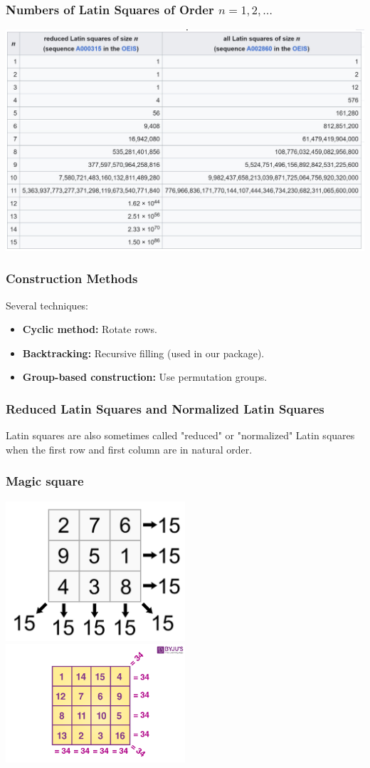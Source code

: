 \documentclass{beamer}
\begin{document}
\begin{frame}
\frametitle{Numbers of Latin Squares of Order $n=1, 2, \dots$}
\includegraphics[width=1\textwidth]{img18}
\end{frame}

\begin{frame}
\frametitle{Construction Methods}
Several techniques:
\begin{itemize}
  \item \textbf{Cyclic method:} Rotate rows.
  \item \textbf{Backtracking:} Recursive filling (used in our package).
  \item \textbf{Group-based construction:} Use permutation groups.
\end{itemize}
\end{frame}

\begin{frame}
\frametitle{Reduced Latin Squares and Normalized Latin Squares}
Latin squares are also sometimes called "reduced" or "normalized" Latin squares when the first row and first column are in natural order. 
\end{frame}

\begin{frame}
\frametitle{Magic square}
\includegraphics[width=0.5\textwidth]{img14}
\includegraphics[width=0.5\textwidth]{img13}
\end{frame}
\end{document}
